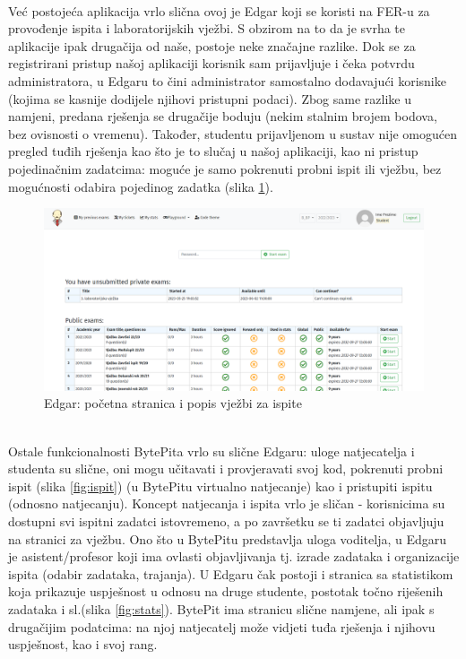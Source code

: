 		\\
		Već postojeća aplikacija vrlo slična ovoj je Edgar koji se koristi na FER-u za provođenje ispita i laboratorijskih vježbi.	S obzirom na to da je svrha te aplikacije ipak drugačija od naše, postoje neke značajne razlike. Dok se za registrirani pristup našoj aplikaciji korisnik sam prijavljuje i čeka potvrdu administratora, u Edgaru to čini administrator samostalno dodavajući korisnike (kojima se kasnije dodijele njihovi pristupni podaci). Zbog same razlike u namjeni, predana rješenja se drugačije boduju (nekim stalnim brojem bodova, bez ovisnosti o vremenu). Također, studentu prijavljenom u sustav nije omogućen pregled tuđih rješenja kao što je to slučaj u našoj aplikaciji, kao ni pristup pojedinačnim zadatcima: moguće je samo pokrenuti probni ispit ili vježbu, bez mogućnosti odabira pojedinog zadatka (slika  \ref{fig:pocstr}).\\
			\begin{figure}[H]
			\includegraphics[scale=0.4]{slike/edgar1}
			\centering
			\caption{Edgar: početna stranica i popis vježbi za ispite}
			\label{fig:pocstr}
		\end{figure}
				\noindent\\
		Ostale funkcionalnosti BytePita vrlo su slične Edgaru: uloge natjecatelja i studenta su slične, oni mogu učitavati i provjeravati svoj kod, pokrenuti probni ispit (slika \ref{fig:ispit}) (u BytePitu virtualno natjecanje) kao i pristupiti ispitu (odnosno natjecanju). Koncept natjecanja i ispita vrlo je sličan - korisnicima su dostupni svi ispitni zadatci istovremeno, a po završetku se ti zadatci objavljuju na stranici za vježbu. 
		Ono što u BytePitu predstavlja uloga voditelja, u Edgaru je asistent/profesor koji ima ovlasti objavljivanja tj. izrade zadataka i organizacije ispita (odabir zadataka, trajanja). U Edgaru čak postoji i stranica sa statistikom koja prikazuje uspješnost u odnosu na druge studente, postotak točno riješenih zadataka i sl.(slika  \ref{fig:stats}). BytePit ima stranicu slične namjene, ali ipak s drugačijim podatcima: na njoj natjecatelj može vidjeti tuđa rješenja i njihovu uspješnost, kao i svoj rang.	\\
		
